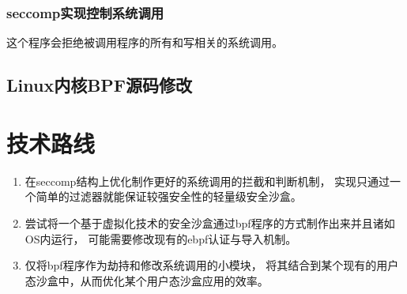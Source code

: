 \documentclass[AutoFakeBold,a4paper]{ctexart}
\begin{document}
\subsubsection{seccomp实现控制系统调用}

这个程序会拒绝被调用程序的所有和写相关的系统调用。

\subsection{Linux内核BPF源码修改}

\section{技术路线}

\begin{enumerate}
    \item 在seccomp结构上优化制作更好的系统调用的拦截和判断机制，
    实现只通过一个简单的过滤器就能保证较强安全性的轻量级安全沙盒。
    \item 尝试将一个基于虚拟化技术的安全沙盒通过bpf程序的方式制作出来并且诸如OS内运行，
    可能需要修改现有的ebpf认证与导入机制。
    \item 仅将bpf程序作为劫持和修改系统调用的小模块，
    将其结合到某个现有的用户态沙盒中，从而优化某个用户态沙盒应用的效率。
\end{enumerate}



\end{document}
